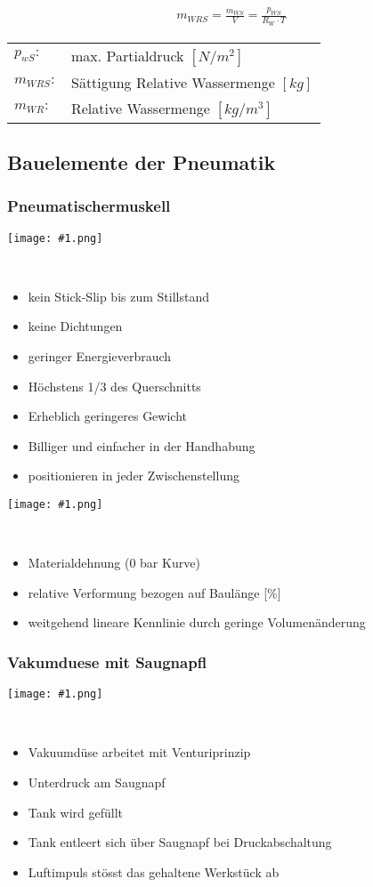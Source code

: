 \documentclass[landscape,a4paper,10pt]{article}
\newcommand{\graphiccol}[1]{
\noindent
\begin{minipage}{\columnwidth}
\centering
\texttt{[image: \#1.png]}
\end{minipage}
\medskip \\
}
\begin{document}
\begin{multicols*}{3}
\begin{align*}
m_{WRS} = \frac{m_{WS}}{V} = \frac{p_{WS}}{R_W \cdot T}
\end{align*}

\begin{tabular}{ll}
$p_{wS}:$ & max. Partialdruck $[N/m^2]$ \\
$m_{WRS}:$ & Sättigung Relative Wassermenge $[kg]$ \\
$m_{WR}:$ & Relative Wassermenge $[kg/m^3]$
\end{tabular}

\subsection{Bauelemente der Pneumatik}
\subsubsection{Pneumatischermuskell}
\graphiccol{Pneumatischermuskel}
\begin{itemize}
\item kein Stick-Slip bis zum Stillstand
\item keine Dichtungen
\item geringer Energieverbrauch
\item Höchstens 1/3 des Querschnitts
\item Erheblich geringeres Gewicht
\item Billiger und einfacher in der Handhabung
\item positionieren in jeder Zwischenstellung
\end{itemize}

\graphiccol{Pneumatischermuskel_Kennlinienfeld}
\begin{itemize}
\item Materialdehnung (0 bar Kurve)
\item relative Verformung bezogen auf Baulänge [\%]
\item weitgehend lineare Kennlinie durch geringe Volumenänderung
\end{itemize}

\subsubsection{Vakumduese mit Saugnapfl}
\graphiccol{Vakumduese_mit_Saugnapf}
\begin{itemize}
\item Vakuumdüse arbeitet mit Venturiprinzip
\item Unterdruck am Saugnapf
\item Tank wird gefüllt
\item Tank entleert sich über Saugnapf bei Druckabschaltung
\item Luftimpuls stösst das gehaltene Werkstück ab
\end{itemize}


\end{multicols*}
\end{document}
